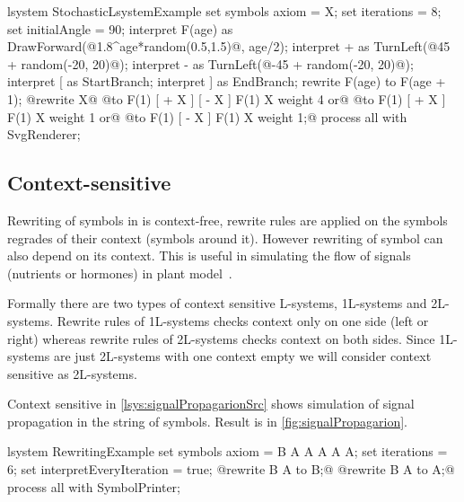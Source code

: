 \begin{Lsystem}[label=lsys:randExample,caption={Stochastic \lsystem with randomized interpretation of symbols and rewrite rule replacements}]
lsystem StochasticLsystemExample {
	set symbols axiom = X;
	set iterations = 8;
	set initialAngle = 90;
	interpret F(age) as DrawForward(@1.8^age*random(0.5,1.5)@, age/2);
	interpret + as TurnLeft(@45 + random(-20, 20)@);
	interpret - as TurnLeft(@-45 + random(-20, 20)@);
	interpret [ as StartBranch;
	interpret ] as EndBranch;
	rewrite F(age) to F(age + 1);
	@rewrite X@
		@to F(1) [ + X ] [ - X ] F(1) X  weight 4 or@
		@to F(1) [ + X ]         F(1) X  weight 1 or@
		@to F(1)         [ - X ] F(1) X  weight 1;@
}
process all with SvgRenderer;
\end{Lsystem}


\subsection{Context-sensitive \lsystems}

\newcommand{\onelsystems}{\mbox{1L-systems}\xspace}
\newcommand{\twolsystems}{\mbox{2L-systems}\xspace}

Rewriting of symbols in \zerolsystems is context-free, rewrite rules are applied on the symbols regrades of their context (symbols around it).
However rewriting of symbol can also depend on its context.
This is useful in simulating the flow of signals (nutrients or hormones) in plant model~\citep{PL91}.

Formally there are two types of context sensitive L-systems, \onelsystems and \twolsystems.
Rewrite rules of \onelsystems checks context only on one side (left or right) whereas rewrite rules of \twolsystems checks context on both sides.
Since \onelsystems are just \twolsystems with one context empty we will consider context sensitive \lsystems as \twolsystems.

Context sensitive \lsystem in \autoref{lsys:signalPropagarionSrc} shows simulation of signal propagation in the string of symbols.
Result is in \autoref{fig:signalPropagarion}.

\begin{Lsystem}[label=lsys:signalPropagarionSrc,caption={Context-sensitive \lsystems simulating signal propagation}]
lsystem RewritingExample {
	set symbols axiom = B A A A A A;
	set iterations = 6;
	set interpretEveryIteration = true;
	@rewrite {B} A     to B;@
	@rewrite     B {A} to A;@
}
process all with SymbolPrinter;
\end{Lsystem}

